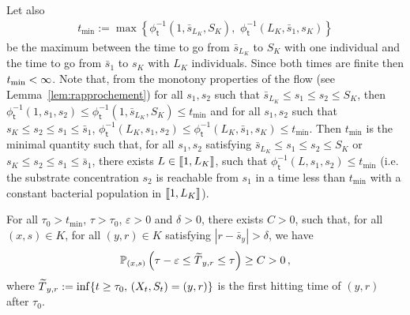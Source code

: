 \documentclass[10pt]{amsart}
\theoremstyle{definition}\newtheorem{defi}[theo]{Definition}\newtheorem{rema}[theo]{Remark}\newtheorem{exam}[theo]{Example}\newtheorem{exem}[theo]{Example}\newtheorem{nota}[theo]{Notation}
\newcommand{\llbracket}{\mathopen{[\mkern -2.7mu[}}
\newcommand{\rrbracket}{\mathclose{]\mkern -2.7mu]}}
\newcommand{\PP}{\mathbb{P}}
\newcommand{\SminK}{s_K}
\newcommand{\SmaxK}{S_K}
\newcommand{\phit}{\phi_\textsf{t}^{-1}}
\newcommand{\lmax}{{L_K}}
\newcommand{\setunlmax}{\llbracket 1, \lmax\rrbracket}
\newcommand{\1}{\mathbf{1}}
\let\oldtilde\tilde
\renewcommand*{\tilde}[1]{\mathchoice{\widetilde{#1}}{\widetilde{#1}}{\oldtilde{#1}}{\oldtilde{#1}}}
\begin{document}
Let also
\begin{align}\label{def:tmin}
t_{\min}:= \max\left\{\phit\left(1,\bar s_{\lmax},\SmaxK\right),\, \,\phit\left(\lmax,\bar s_1,\SminK\right)\right\}
\end{align}
be the maximum between the time to go from $\bar s_{\lmax}$ to $\SmaxK$ with one individual and the time to go from $\bar s_1$ to $\SminK$ with $\lmax$ individuals. Since both times are finite then $t_{\min}\linebreak<\infty$. Note that, from the monotony properties of the flow (see Lemma~\ref{lem:rapprochement}) for all $s_1,s_2$ such that $\bar s_{\lmax}\leq s_1\leq s_2\leq \SmaxK$, then $\phit(1,s_1,s_2)\leq \phit(1,\bar s_{\lmax},\SmaxK) \leq t_{\min}$ and for all $s_1,s_2$ such that $\SminK\leq s_2\leq s_1\leq \bar s_1$, $\phit(\lmax,s_1,s_2)\leq \phit(\lmax,\bar s_1,\SminK)\leq t_{\min}$. Then $t_{\min}$ is the minimal quantity such that, for all $s_1, s_2$ satisfying $\bar s_{\lmax}\leq s_1\leq s_2\leq \SmaxK$ or $\SminK\leq s_2\leq s_1\leq \bar s_1$, there exists $L\in \setunlmax$, such that $\phit(L,s_1,s_2)\leq t_{\min}$ (i.e. the substrate concentration $s_2$ is reachable from $s_1$ in a time less than $t_{\min}$ with a constant bacterial population in $\setunlmax$).


\begin{prop}\label{prop.partout.a.partout}
For all $\tau_0>t_{\min}$, $\tau>\tau_0$, $\varepsilon>0$ and $\delta>0$, there exists $C>0$, such that, for all $(x,s)\in K$, for all $(y,r)\in K$ satisfying $|r-\bar s_y|>\delta$, we have
\[
\PP_{(x,s)}\left(\tau-\varepsilon \leq \tilde T_{y,r} \leq \tau\right)\geq C>0\,,
\]
where $\tilde T_{y,r}:= \inf\{t\geq \tau_0,\, (X_t,S_t)=(y,r)\}$ is the first hitting time of $(y,r)$ after $\tau_0$.
\end{prop}
\end{document}
